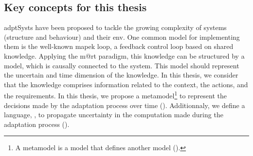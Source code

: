 \subsection{Key concepts for this thesis}
\Glspl{adptSyst} have been proposed to tackle the growing complexity of systems (structure and behaviour) and their \gls{env}.
One common model for implementing them is the well-known \gls{mapek} loop, a feedback control loop based on shared knowledge.
Applying the \gls{m@rt} paradigm, this knowledge can be structured by a \gls{model}, which is causally connected to the system.
This \gls{model} should represent the uncertain and time dimension of the knowledge.
In this thesis, we consider that the knowledge comprises information related to the context, the actions, and the requirements.
In this thesis, we propose a \gls{metamodel}\footnote{A \gls{metamodel} is a \gls{model} that defines another \gls{model} (\cf {}).} to represent the decisions made by the adaptation process over time (\cf {}).
Additionnaly, we define a language, \langName, to propagate uncertainty in the computation made during the adaptation process (\cf {}).







